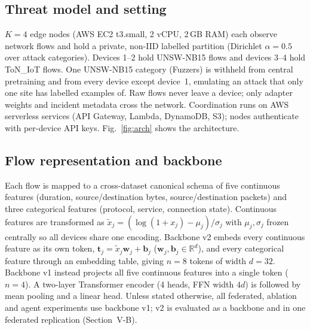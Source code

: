 \documentclass[conference]{IEEEtran}
\begin{document}
\subsection{Threat model and setting}
$K{=}4$ edge nodes (AWS EC2 t3.small, 2 vCPU, 2\,GB RAM) each observe network
flows and hold a private, non-IID labelled partition (Dirichlet $\alpha{=}0.5$
over attack categories). Devices 1--2 hold UNSW-NB15 flows and devices 3--4
hold ToN\_IoT flows. One UNSW-NB15 category (Fuzzers) is withheld from central pretraining and
from every device except device~1, emulating an attack that only one site has
labelled examples of. Raw flows never leave a device; only adapter weights and
incident metadata cross the network. Coordination runs on AWS serverless
services (API Gateway, Lambda, DynamoDB, S3); nodes authenticate with
per-device API keys. Fig.~\ref{fig:arch} shows the architecture.

\subsection{Flow representation and backbone}
Each flow is mapped to a cross-dataset canonical schema of five continuous
features (duration, source/destination bytes, source/destination packets)
and three categorical features (protocol, service, connection state).
Continuous features are transformed as $\tilde x_j = (\log(1+x_j)-\mu_j)/\sigma_j$
with $\mu_j,\sigma_j$ frozen centrally so all devices share one encoding.
Backbone v2 embeds every continuous feature as its own token,
$\mathbf t_j = \tilde x_j \mathbf w_j + \mathbf b_j$ ($\mathbf w_j,\mathbf b_j\in\mathbb R^{d}$),
and every categorical feature through an embedding table, giving
$n{=}8$ tokens of width $d{=}32$. Backbone v1 instead projects all five
continuous features into a single token ($n{=}4$). A two-layer Transformer encoder
(4 heads, FFN width $4d$) is followed by mean pooling and a linear head.
Unless stated otherwise, all federated, ablation and agent experiments use
backbone v1; v2 is evaluated as a backbone and in one federated
replication (Section~V-B).
\end{document}
